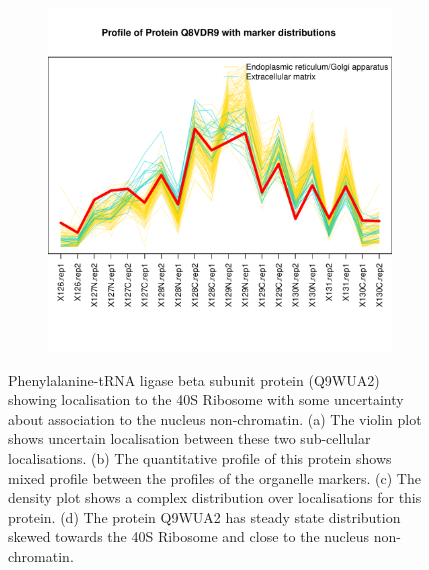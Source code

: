 \documentclass[12pt,english]{article}\usepackage[]{graphicx}\usepackage[]{color}
\makeatletter
\def\maxwidth{ %
  \ifdim\Gin@nat@width>\linewidth
    \linewidth
  \else
    \Gin@nat@width
  \fi
}
\newenvironment{knitrout}{}{} %
\makeatother
\begin{document}
\begin{figure}[h]
\begin{subfigure}[t]{0.5\textwidth}
\begin{knitrout}
{}



\end{knitrout}
    \caption{}
  \end{subfigure}%
  \begin{subfigure}[t]{0.5\textwidth}
    \centering
\begin{knitrout}
\color{fgcolor}

{\centering \includegraphics[width=\maxwidth]{figure/unnamed-chunk-21-1} 

}



\end{knitrout}
    \caption{}
  \end{subfigure}

\caption{Phenylalanine-tRNA ligase
beta subunit protein (Q9WUA2) showing localisation to the
  40S Ribosome with some uncertainty about association to the nucleus non-chromatin.
  (a) The violin plot shows
    uncertain localisation between these two sub-cellular
    localisations. (b) The
    quantitative profile of this protein shows mixed profile between the
    profiles of the organelle markers. (c) The density plot shows a
    complex distribution over localisations for this protein. (d) The protein Q9WUA2 has steady state
    distribution skewed towards the 40S Ribosome and close to the nucleus non-chromatin.}
  \label{fig:Q9WUA2}
\end{figure}
\end{document}

